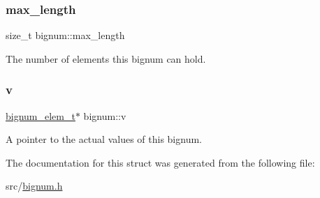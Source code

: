 \subsubsection{\texorpdfstring{max\+\_\+length}{max\_length}}
{\footnotesize\ttfamily size\+\_\+t bignum\+::max\+\_\+length}

The number of elements this bignum can hold. \mbox{\label{structbignum_a60955e5f7046ec12c4c292510ad18146}} 
\subsubsection{\texorpdfstring{v}{v}}
{\footnotesize\ttfamily \hyperlink{bignum_8h_ac19e9b7c8236cb1d9e8b4bf16d0ce513}{bignum\+\_\+elem\+\_\+t}$\ast$ bignum\+::v}

A pointer to the actual values of this bignum. 

The documentation for this struct was generated from the following file\+:\begin{DoxyCompactItemize}
\item 
src/\hyperlink{bignum_8h}{bignum.\+h}\end{DoxyCompactItemize}
